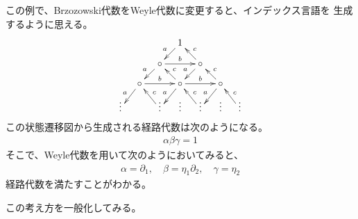 	\begin{note}[インデックス言語]\label{note:インデックス言語} %
		この例で、Brzozowski代数をWeyle代数に変更すると、インデックス言語を
		生成するように思える。
		\begin{equation}\begin{split} %
			\xymatrix@R=1em@C=1em{
				& & & 1 \ar[ld]_a \\
				& & \circ \ar[ld]_a \ar[rr]^b & & \circ \ar[ld]_a \ar[lu]_c \\
				& \circ \ar[ld]_a \ar[rr]^b 
					& & \circ \ar[ld]_a \ar[lu]_c \ar[rr]^b
					& & \circ \ar[ld]_a \ar[lu]_c \\
				\vdots & & \vdots \ar[lu]_c & \vdots & \vdots \ar[lu]_c 
					& \vdots & \vdots \ar[lu]_c
			}
		\end{split}\end{equation} %
		この状態遷移図から生成される経路代数は次のようになる。
		\begin{equation*}\begin{split} %
			\alpha\beta\gamma = 1
		\end{split}\end{equation*} %
		そこで、Weyle代数を用いて次のようにおいてみると、
		\begin{equation*}\begin{split} %
			\alpha = \partial_1,\quad \beta = \eta_1\partial_2
				,\quad \gamma = \eta_2
		\end{split}\end{equation*} %
		経路代数を満たすことがわかる。
	\end{note} %

	この考え方を一般化してみる。

